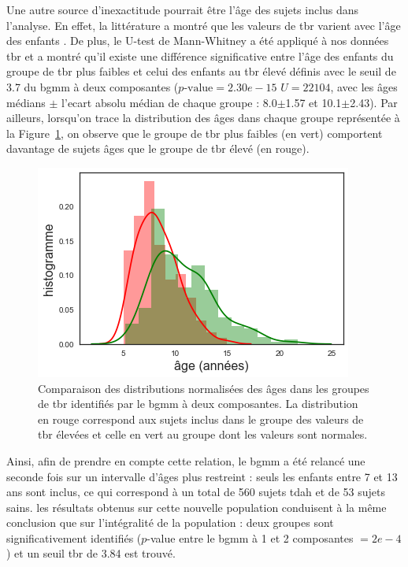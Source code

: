 Une autre source d'inexactitude pourrait être l'âge des sujets inclus dans l'analyse. En effet, la littérature a montré que les valeurs de \gls{tbr} varient
avec l'âge des enfants \citep{Liechti2013, Snyder2015, Perone2018}. De plus, le U-test de Mann-Whitney a été appliqué à nos données \gls{tbr} et a montré
qu'il existe une différence significative entre l'âge des enfants du groupe de \gls{tbr} plus faibles et celui des enfants au \gls{tbr} élevé définis avec 
le seuil de 3.7 du \gls{bgmm} à deux composantes
($p\text{-value} = 2.30e-15$\text{,} $U = 22 104$, avec les âges médians $\pm$ l'ecart absolu médian de chaque groupe : 8.0$\pm$1.57 et 10.1$\pm$2.43). Par ailleurs, lorsqu'on trace
la distribution des âges dans chaque groupe représentée à la Figure~\ref{Figure:tbr_age_distribution}, on observe que le groupe de \gls{tbr} plus faibles (en vert) comportent 
davantage de sujets âges que le groupe de \gls{tbr} élevé (en rouge). 

\begin{figure}[h!]
  \centering
	\includegraphics[width=0.7\linewidth]{figures/chapter-4/tbr-age-distribution} 
  \caption{Comparaison des distributions normalisées des âges dans les groupes de \gls{tbr} identifiés par le \gls{bgmm} à deux composantes. La distribution
	en rouge correspond aux sujets inclus dans le groupe des valeurs de \gls{tbr} élevées et celle en vert au groupe dont les valeurs sont normales.}
  \label{Figure:tbr_age_distribution}
\end{figure}

Ainsi, afin de prendre en compte cette relation, le \gls{bgmm} a été relancé une seconde fois sur un intervalle d'âges plus restreint : seuls les enfants
entre 7 et 13 ans sont inclus, ce qui correspond à un total de 560 sujets \gls{tdah} et de 53 sujets sains. les résultats obtenus sur cette nouvelle population 
conduisent à la même conclusion que sur l'intégralité de la population : deux groupes sont significativement identifiés ($p$-value entre le \gls{bgmm} à 1 et 2 
composantes $= 2e-4$) et un seuil \gls{tbr} de 3.84 est trouvé. 

